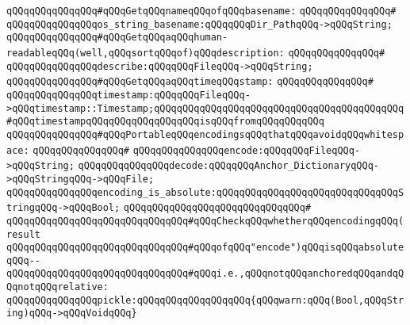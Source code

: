 \verb|qQQqqQQqqQQqqQQq#qQQqGetqQQqnameqQQqofqQQqbasename:|\newline
\verb|qQQqqQQqqQQqqQQq#|\newline
\verb|qQQqqQQqqQQqqQQqos_string_basename:qQQqqQQqDir_PathqQQq->qQQqString;|\newline
\newline
\verb|qQQqqQQqqQQqqQQq#qQQqGetqQQqaqQQqhuman-readableqQQq(well,qQQqsortqQQqof)qQQqdescription:|\newline
\verb|qQQqqQQqqQQqqQQq#|\newline
\verb|qQQqqQQqqQQqqQQqdescribe:qQQqqQQqFileqQQq->qQQqString;|\newline
\newline
\verb|qQQqqQQqqQQqqQQq#qQQqGetqQQqaqQQqtimeqQQqstamp:|\newline
\verb|qQQqqQQqqQQqqQQq#|\newline
\verb|qQQqqQQqqQQqqQQqtimestamp:qQQqqQQqFileqQQq->qQQqtimestamp::Timestamp;qQQqqQQqqQQqqQQqqQQqqQQqqQQqqQQqqQQqqQQqqQQq#qQQqtimestampqQQqqQQqqQQqqQQqqQQqisqQQqfromqQQqqQQqqQQq|\newline
\newline
\verb|qQQqqQQqqQQqqQQq#qQQqPortableqQQqencodingsqQQqthatqQQqavoidqQQqwhitespace:|\newline
\verb|qQQqqQQqqQQqqQQq#|\newline
\verb|qQQqqQQqqQQqqQQqencode:qQQqqQQqFileqQQq->qQQqString;|\newline
\verb|qQQqqQQqqQQqqQQqdecode:qQQqqQQqAnchor_DictionaryqQQq->qQQqStringqQQq->qQQqFile;|\newline
\newline
\verb|qQQqqQQqqQQqqQQqencoding_is_absolute:qQQqqQQqqQQqqQQqqQQqqQQqqQQqqQQqStringqQQq->qQQqBool;|\newline
\verb|qQQqqQQqqQQqqQQqqQQqqQQqqQQqqQQq#|\newline
\verb|qQQqqQQqqQQqqQQqqQQqqQQqqQQqqQQq#qQQqCheckqQQqwhetherqQQqencodingqQQq(result|\newline
\verb|qQQqqQQqqQQqqQQqqQQqqQQqqQQqqQQq#qQQqofqQQq"encode")qQQqisqQQqabsoluteqQQq--|\newline
\verb|qQQqqQQqqQQqqQQqqQQqqQQqqQQqqQQq#qQQqi.e.,qQQqnotqQQqanchoredqQQqandqQQqnotqQQqrelative:|\newline
\newline
\newline
\newline
\verb|qQQqqQQqqQQqqQQqpickle:qQQqqQQqqQQqqQQqqQQq{qQQqwarn:qQQq(Bool,qQQqString)qQQq->qQQqVoidqQQq}|\newline
